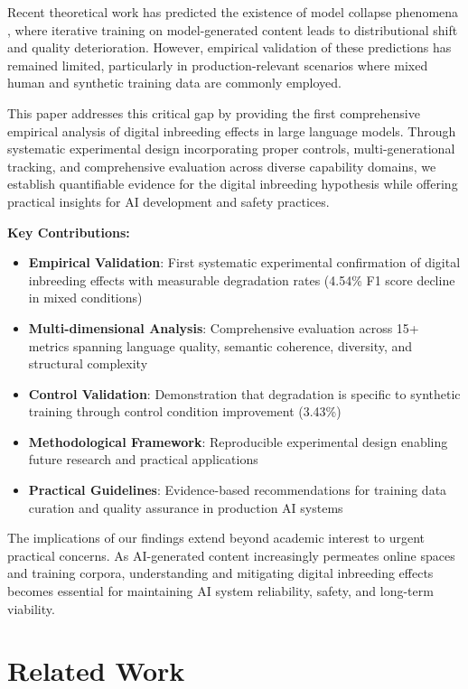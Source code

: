 \documentclass[11pt]{article}
\begin{document}
Recent theoretical work has predicted the existence of model collapse phenomena \citep{shumailov2023curse}, where iterative training on model-generated content leads to distributional shift and quality deterioration. However, empirical validation of these predictions has remained limited, particularly in production-relevant scenarios where mixed human and synthetic training data are commonly employed.

This paper addresses this critical gap by providing the first comprehensive empirical analysis of digital inbreeding effects in large language models. Through systematic experimental design incorporating proper controls, multi-generational tracking, and comprehensive evaluation across diverse capability domains, we establish quantifiable evidence for the digital inbreeding hypothesis while offering practical insights for AI development and safety practices.

\textbf{Key Contributions:}
\begin{itemize}
    \item \textbf{Empirical Validation}: First systematic experimental confirmation of digital inbreeding effects with measurable degradation rates (4.54\% F1 score decline in mixed conditions)
    \item \textbf{Multi-dimensional Analysis}: Comprehensive evaluation across 15+ metrics spanning language quality, semantic coherence, diversity, and structural complexity
    \item \textbf{Control Validation}: Demonstration that degradation is specific to synthetic training through control condition improvement (3.43\%)
    \item \textbf{Methodological Framework}: Reproducible experimental design enabling future research and practical applications
    \item \textbf{Practical Guidelines}: Evidence-based recommendations for training data curation and quality assurance in production AI systems
\end{itemize}

The implications of our findings extend beyond academic interest to urgent practical concerns. As AI-generated content increasingly permeates online spaces and training corpora, understanding and mitigating digital inbreeding effects becomes essential for maintaining AI system reliability, safety, and long-term viability.

\section{Related Work}
\end{document}
